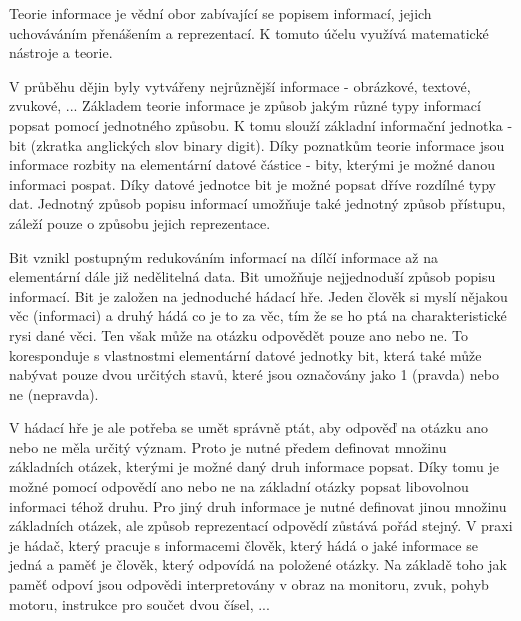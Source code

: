 

%

%
%




\Obsah


Teorie informace je vědní obor zabívající se popisem informací, jejich uchováváním přenášením a reprezentací. K tomuto účelu využívá matematické nástroje a teorie. 

V průběhu dějin byly vytvářeny nejrůznější informace - obrázkové, textové, zvukové, ... Základem teorie informace je způsob jakým různé typy informací popsat pomocí jednotného způsobu. K tomu slouží základní informační jednotka - bit (zkratka anglických slov binary digit). Díky poznatkům teorie informace jsou informace rozbity na elementární datové částice - bity, kterými je možné danou informaci pospat.  Díky datové jednotce bit je možné popsat dříve rozdílné typy dat. Jednotný způsob popisu informací umožňuje také jednotný způsob přístupu, záleží pouze o způsobu jejich reprezentace.

Bit vznikl postupným redukováním informací na dílčí informace až na elementární dále již nedělitelná data. Bit umožňuje nejjednoduší způsob popisu informací. Bit je založen na jednoduché hádací hře. Jeden člověk si myslí nějakou věc (informaci) a druhý hádá co je to za věc, tím že se ho ptá na charakteristické rysi dané věci. Ten však může na otázku odpovědět pouze ano nebo ne. To koresponduje s vlastnostmi elementární datové jednotky bit, která také může nabývat pouze dvou určitých stavů, které jsou označovány jako 1 (pravda) nebo ne (nepravda). 

V hádací hře je ale potřeba se umět správně ptát, aby odpověď na otázku ano nebo ne měla určitý význam. Proto je nutné předem definovat množinu základních otázek, kterými je možné daný druh informace popsat. Díky tomu je možné pomocí odpovědí ano nebo ne na základní otázky popsat libovolnou informaci téhož druhu. Pro jiný druh informace je nutné definovat jinou množinu základních otázek, ale způsob reprezentací odpovědí zůstává pořád stejný. V praxi je hádač, který pracuje s informacemi člověk, který hádá o jaké informace se jedná a paměť je člověk, který odpovídá na položené otázky. Na základě toho jak paměť odpoví jsou odpovědi interpretovány v obraz na monitoru, zvuk, pohyb motoru, instrukce pro součet dvou čísel, ...

